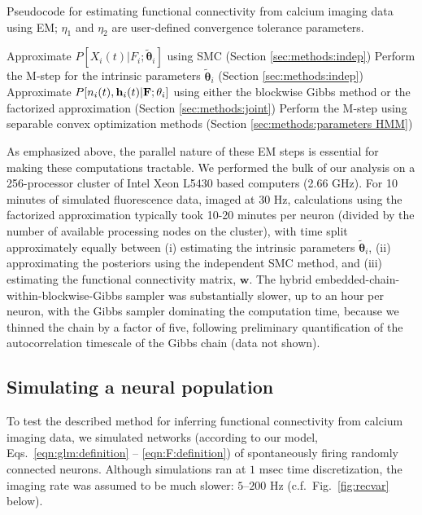 \documentclass[aoas,preprint]{imsart}
\newcommand{\bth}{\mathbf{\theta}}
\newcommand{\w}{w}
\newcommand{\bw}{\mathbf{\w}}
\newcommand{\bF}{{\bf F}}
\newcommand{\bh}{\mathbf{h}}
\newcommand{\tbth}{\tilde{\bth}}
\begin{document}
\begin{algorithm}[t!]
\caption{Pseudocode for estimating functional connectivity from
calcium imaging data using EM; $\eta_1$ and $\eta_2$ are
user-defined convergence tolerance parameters.}
\label{eqn:pseudocode}
\begin{algorithmic}
\While{$|{\bw}^{(l)}-{\bw}^{(l-1)}|>\eta_1$}
    \While{$|{\tbth_i}^{(l)}-{\tbth_i}^{(l-1)}|> \eta_2$}
      \State Approximate $P[X_i(t)|F_i; \tbth_i]$ using SMC (Section \ref{sec:methods:indep})
      \State Perform the M-step for the intrinsic parameters $\tbth_i$ (Section \ref{sec:methods:indep})
    \EndWhile
  \EndFor
      \State Approximate $P[n_i(t), \bh_i(t) |\bF; \bth_i]$ using either the blockwise Gibbs
      \State method or the factorized approximation (Section \ref{sec:methods:joint})
    \EndFor
  	\State Perform the M-step using separable convex optimization methods (Section \ref{sec:methods:parameters HMM})
  \EndFor
\EndWhile
\end{algorithmic}
\end{algorithm}

As emphasized above, the parallel nature of these EM steps is
essential for making these computations tractable. We performed the
bulk of our analysis on a 256-processor cluster of Intel Xeon L5430
based computers (2.66 GHz). For 10 minutes of simulated fluorescence
data, imaged at $30$ Hz, calculations using the factorized
approximation typically took 10-20 minutes per neuron (divided by the
number of available processing nodes on the cluster), with time split
approximately equally between (i) estimating the intrinsic parameters
$\tbth_i $, (ii) approximating the posteriors using the independent
SMC method, and (iii) estimating the functional connectivity matrix,
$\bw$. The hybrid embedded-chain-within-blockwise-Gibbs sampler was
substantially slower, up to an hour per neuron, with the Gibbs sampler
dominating the computation time, because we thinned the chain by a
factor of five, following preliminary quantification of the
autocorrelation timescale of the Gibbs chain (data not shown).


\subsection{Simulating a neural population} \label{sec:results:simulations}

To test the described method for inferring functional connectivity
from calcium imaging data, we simulated networks (according to our
model, Eqs.~\eqref{eqn:glm:definition} -- \eqref{eqn:F:definition}) of
spontaneously firing randomly connected neurons. Although simulations
ran at $1$ msec time discretization, the imaging rate was assumed to
be much slower: $5$--$200$ Hz (c.f.~Fig.~\ref{fig:recvar} below).
\end{document}
